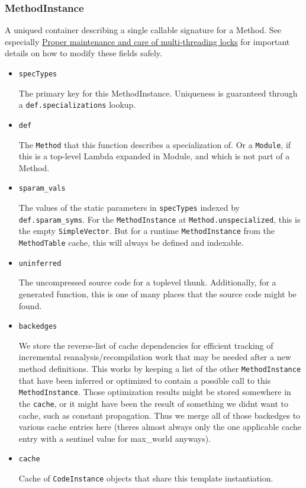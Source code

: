\hypertarget{2584833319372808594}{}


\subsubsection{MethodInstance}



A unique{\textquotesingle}d container describing a single callable signature for a Method. See especially \hyperlink{17047801949293328593}{Proper maintenance and care of multi-threading locks} for important details on how to modify these fields safely.



\begin{itemize}
\item \texttt{specTypes}

The primary key for this MethodInstance. Uniqueness is guaranteed through a \texttt{def.specializations} lookup.


\item \texttt{def}

The \texttt{Method} that this function describes a specialization of. Or a \texttt{Module}, if this is a top-level Lambda expanded in Module, and which is not part of a Method.


\item \texttt{sparam\_vals}

The values of the static parameters in \texttt{specTypes} indexed by \texttt{def.sparam\_syms}. For the \texttt{MethodInstance} at \texttt{Method.unspecialized}, this is the empty \texttt{SimpleVector}. But for a runtime \texttt{MethodInstance} from the \texttt{MethodTable} cache, this will always be defined and indexable.


\item \texttt{uninferred}

The uncompressed source code for a toplevel thunk. Additionally, for a generated function, this is one of many places that the source code might be found.


\item \texttt{backedges}

We store the reverse-list of cache dependencies for efficient tracking of incremental reanalysis/recompilation work that may be needed after a new method definitions. This works by keeping a list of the other \texttt{MethodInstance} that have been inferred or optimized to contain a possible call to this \texttt{MethodInstance}. Those optimization results might be stored somewhere in the \texttt{cache}, or it might have been the result of something we didn{\textquotesingle}t want to cache, such as constant propagation. Thus we merge all of those backedges to various cache entries here (there{\textquotesingle}s almost always only the one applicable cache entry with a sentinel value for max\_world anyways).


\item \texttt{cache}

Cache of \texttt{CodeInstance} objects that share this template instantiation.

\end{itemize}


